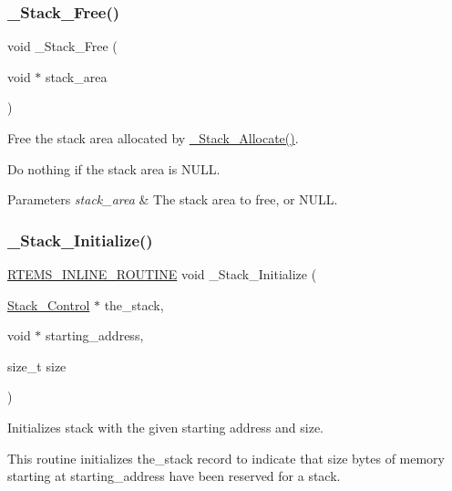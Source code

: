 \subsubsection{\texorpdfstring{\_Stack\_Free()}{\_Stack\_Free()}}
{\footnotesize\ttfamily void \+\_\+\+Stack\+\_\+\+Free (\begin{DoxyParamCaption}\item[{void $\ast$}]{stack\+\_\+area }\end{DoxyParamCaption})}



Free the stack area allocated by \mbox{\hyperlink{group__RTEMSScoreStack_gaa75b0bd2f7d99098ec726dbaa343cebe}{\+\_\+\+Stack\+\_\+\+Allocate()}}. 

Do nothing if the stack area is N\+U\+LL.


\begin{DoxyParams}{Parameters}
{\em stack\+\_\+area} & The stack area to free, or N\+U\+LL. \\
\hline
\end{DoxyParams}
\mbox{\label{group__RTEMSScoreStack_gacac0f0f9105a47a592e8d215a29c58a4}} 
\subsubsection{\texorpdfstring{\_Stack\_Initialize()}{\_Stack\_Initialize()}}
{\footnotesize\ttfamily \mbox{\hyperlink{group__RTEMSScoreBaseDefs_gac216239df231d5dbd15e3520b0b9313f}{R\+T\+E\+M\+S\+\_\+\+I\+N\+L\+I\+N\+E\+\_\+\+R\+O\+U\+T\+I\+NE}} void \+\_\+\+Stack\+\_\+\+Initialize (\begin{DoxyParamCaption}\item[{\mbox{\hyperlink{structStack__Control}{Stack\+\_\+\+Control}} $\ast$}]{the\+\_\+stack,  }\item[{void $\ast$}]{starting\+\_\+address,  }\item[{size\+\_\+t}]{size }\end{DoxyParamCaption})}



Initializes stack with the given starting address and size. 

This routine initializes the\+\_\+stack record to indicate that size bytes of memory starting at starting\+\_\+address have been reserved for a stack.



